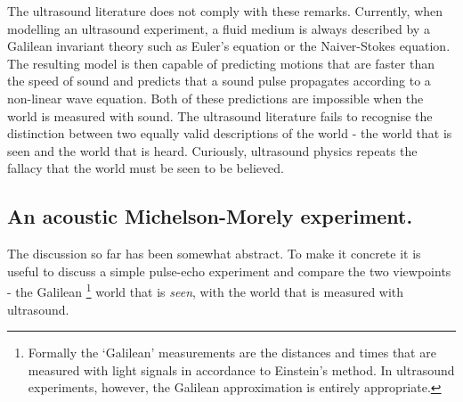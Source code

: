 The ultrasound literature does not comply with these remarks.
Currently, when modelling an ultrasound experiment, a fluid medium is always described by a Galilean invariant theory such as Euler's equation or the Naiver-Stokes equation.
The resulting model is then capable of predicting motions that are faster than the speed of sound
and predicts that  a sound pulse  propagates according to  a non-linear wave equation.
Both of these predictions are impossible when the world is measured with sound.
%
The ultrasound literature fails to recognise the distinction between  two equally valid descriptions of the world -
the world that is seen
and the world that is heard.
Curiously, ultrasound physics repeats the   fallacy that  the world must be seen to be believed.

\subsection{An acoustic Michelson-Morely  experiment.}

The discussion so far has been somewhat abstract.
To make it concrete it is useful to discuss a simple pulse-echo experiment and  compare the two viewpoints
- the Galilean%
\footnote{Formally the `Galilean' measurements are the distances and times that are  measured with light signals in accordance to Einstein's method\cite{Einstein1905}.
In ultrasound experiments, however, the Galilean approximation is entirely appropriate.}
 world that is {\em seen}, with the world that is measured with ultrasound. %
%


